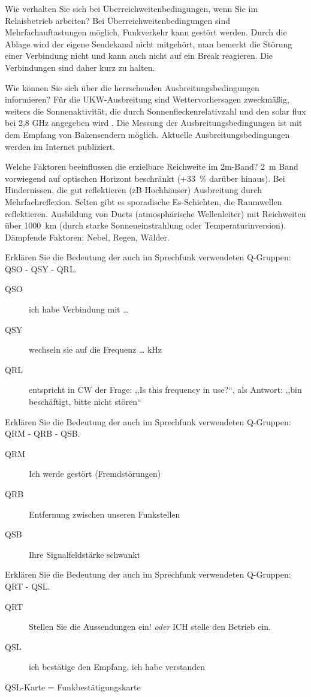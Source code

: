 \documentclass[avery5371,grid,frame,a4paper]{flashcards}
\newcommand{\card}[3]{
  \begin{flashcard}[{\chap} -- #1]{#2}#3\end{flashcard}
}
\begin{document}
\card{24}{Wie verhalten Sie sich bei Überreichweitenbedingungen, wenn Sie im Relaisbetrieb arbeiten?}{
  Bei Überreichweitenbedingungen sind Mehrfachauftastungen möglich, Funkverkehr kann gestört werden. Durch die Ablage wird der eigene Sendekanal nicht mitgehört, man bemerkt die Störung einer Verbindung nicht und kann auch nicht auf ein Break reagieren. Die Verbindungen sind daher kurz zu halten.
}
\card{25}{Wie können Sie sich über die herrschenden Ausbreitungsbedingungen informieren?}{
  Für die UKW-Ausbreitung sind Wettervorhersagen zweckmäßig, weiters die Sonnenaktivität, die durch Sonnenfleckenrelativzahl und den solar flux bei 2,8 GHz angegeben wird .  Die Messung der Ausbreitungsbedingungen ist mit dem Empfang von Bakensendern möglich. Aktuelle Ausbreitungsbedingungen werden im Internet publiziert.
}
\card{26}{Welche Faktoren beeinflussen die erzielbare Reichweite im 2m-Band?}{
  2~m Band vorwiegend auf optischen Horizont beschränkt (+33~\% darüber hinaus). Bei Hindernissen, die gut reflektieren (zB Hochhäuser) Ausbreitung durch Mehrfachreflexion. Selten gibt es sporadische Es-Schichten, die Raumwellen reflektieren. Ausbildung von Ducts (atmosphärische Wellenleiter) mit Reichweiten über 1000~km (durch starke Sonneneinstrahlung oder Temperaturinversion). Dämpfende Faktoren: Nebel, Regen, Wälder. 
}
\card{27}{Erklären Sie die Bedeutung der auch im Sprechfunk verwendeten Q-Gruppen: QSO - QSY - QRL.}{
  \begin{description}
    \item[QSO] ich habe Verbindung mit \dots
    \item[QSY] wechseln sie auf die Frequenz \dots{} kHz
    \item[QRL]
      entspricht in CW der Frage: ,,Is this frequency in use?``,
      als Antwort: ,,bin beschäftigt, bitte nicht stören``
  \end{description}
}
\card{28}{Erklären Sie die Bedeutung der auch im Sprechfunk verwendeten Q-Gruppen: QRM - QRB - QSB.}{
  \begin{description}
    \item[QRM] Ich werde gestört (Fremdstörungen)
    \item[QRB] Entfernung zwischen unseren Funkstellen
    \item[QSB] Ihre Signalfeldstärke schwankt
  \end{description}
}
\card{29}{Erklären Sie die Bedeutung der auch im Sprechfunk verwendeten Q-Gruppen: QRT - QSL.}{
  \begin{description}
    \item[QRT] Stellen Sie die Aussendungen ein! \textit{oder} ICH stelle den Betrieb ein.
    \item[QSL] ich bestätige den Empfang, ich habe verstanden
  \end{description}
  QSL-Karte = Funkbestätigungskarte
}
\end{document}
